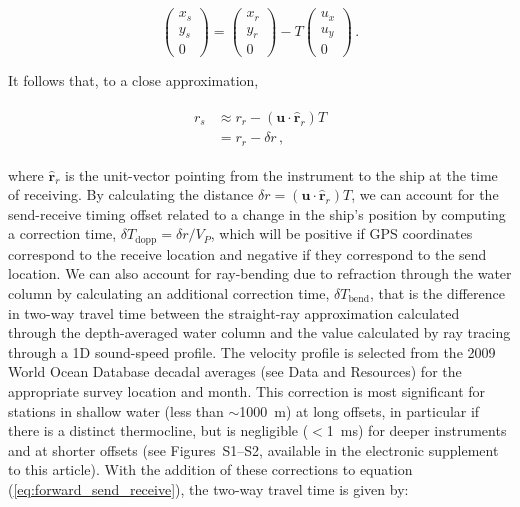 \begin{equation}
\begin{pmatrix} x_s\\y_s\\0 \end{pmatrix} = \begin{pmatrix} x_r\\y_r\\0 \end{pmatrix} - T\begin{pmatrix} u_x\\u_y\\0 \end{pmatrix} \,.
\end{equation}

It follows that, to a close approximation,

\begin{align}
\begin{split}
r_s &\approx r_r - \left(\mathbf{u} \cdot \mathbf{\hat{r}}_r \right) T\\
	&= r_r - \delta r \,,
\end{split}	
\end{align}

where $\mathbf{\hat{r}}_r$ is the unit-vector pointing from the instrument to the ship at the time of receiving. By calculating the distance $\delta r = \left(\mathbf{u} \cdot \mathbf{\hat{r}}_r \right) T$, we can account for the send-receive timing offset related to a change in the ship's position by computing a correction time, $\delta T_{\text{dopp}} = \delta r/V_P$, which will be positive if GPS coordinates correspond to the receive location and negative if they correspond to the send location. We can also account for ray-bending due to refraction through the water column by calculating an additional correction time, $\delta T_{\text{bend}}$, that is the difference in two-way travel time between the straight-ray approximation calculated through the depth-averaged water column and the value calculated by ray tracing through a 1D sound-speed profile. The velocity profile is selected from the 2009 World Ocean Database decadal averages (see Data and Resources) for the appropriate survey location and month. This correction is most significant for stations in shallow water (less than $\sim$1000~m) at long offsets, in particular if there is a distinct thermocline, but is negligible ($<$1~ms) for deeper instruments and at shorter offsets (see Figures~S1--S2, available in the electronic supplement to this article). With the addition of these corrections to equation (\ref{eq:forward_send_receive}), the two-way travel time is given by:

